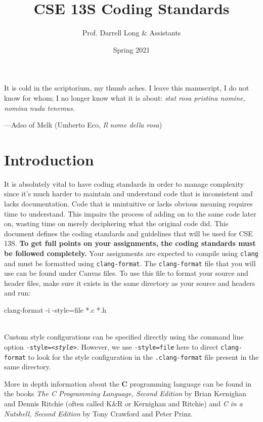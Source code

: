 \documentclass[11pt]{article}
\title{CSE 13S Coding Standards}
\author{Prof. Darrell Long \& Assistants}
\date{Spring 2021}
\begin{document}
\maketitle

\textwidth
\epigraph{It is cold in the scriptorium, my thumb aches. I leave
this manuscript, I do not know for whom; I no longer know what it
is about: \emph{stat rosa pristina nomine, nomina nuda tenemus.}}{---Adso of
Melk (Umberto Eco, \emph{Il nome della rosa})}

\section{Introduction}

It is absolutely vital to have coding standards in order to manage complexity
since it's much harder to maintain and understand code that is inconsistent and
lacks documentation. Code that is unintuitive or lacks obvious meaning requires
time to understand. This impairs the process of adding on to the same code
later on, wasting time on merely deciphering what the original code did.
This document defines the coding standards and guidelines that
will be used for CSE\,13S. \textbf{To get full points on your assignments, the
coding standards must be followed completely.} Your assignments are expected to
compile using \texttt{clang} and must be formatted using \texttt{clang-format}.
The \texttt{clang-format} file that you will use can be found under Canvas
files. To use this file to format your source and header files, make sure it
exists in the same directory as your source and headers and run:

\begin{codelisting}{}
clang-format -i -style=file *.c *.h
\end{codelisting}\\


\noindent Custom style configurations can be specified directly using the command line option
\texttt{-style=\emph{<style>}}. However, we use \texttt{-style=file} here to direct \texttt{clang-format}
to look for the style configuration in the \texttt{.clang-format} file present in the same directory.

More in depth information about the \textbf{C} programming language can be found
in the books \emph{The C Programming Language, Second Edition} by Brian
Kernighan and Dennis Ritchie (often called K\&R or Kernighan and Ritchie) and
\emph{C in a Nutshell, Second Edition} by Tony Crawford and Peter Prinz.
\end{document}
